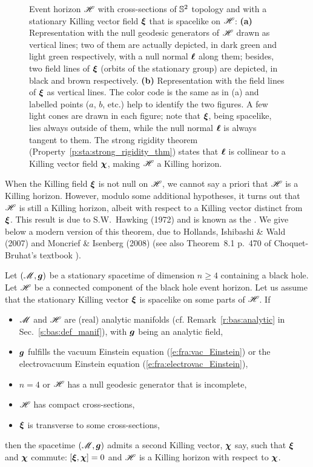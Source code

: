 \begin{figure}
\caption[]{\label{f:sta:rot_horizon} \footnotesize
Event horizon $\mathscr{H}$ with cross-sections of $\mathbb{S}^2$ topology
and with a stationary Killing vector field $\bm{\xi}$ that is
spacelike on $\mathscr{H}$:
\textbf{(a)} Representation with the null geodesic generators of $\mathscr{H}$ drawn as vertical
lines; two of them are actually depicted, in dark green and light green
respectively, with a null normal $\bm{\ell}$ along them; besides,
two field lines of $\bm{\xi}$
(orbits of the stationary group) are depicted, in black and brown
respectively.
\textbf{(b)} Representation with the field lines of $\bm{\xi}$ as vertical lines.
The color code is the same as in (a) and
labelled points ($a$, $b$, etc.) help to identify
the two figures. A few light cones are drawn in each figure; note that $\bm{\xi}$,
being spacelike,
lies always outside of them,
while the null normal $\bm{\ell}$ is always tangent to them.
The strong rigidity theorem (Property~\ref{p:sta:strong_rigidity_thm}) states that
$\bm{\ell}$ is collinear to a Killing vector field $\bm{\chi}$, making $\mathscr{H}$
a Killing horizon.}
\end{figure}

When the Killing field $\bm{\xi}$ is not null on $\mathscr{H}$, we cannot say a priori
that $\mathscr{H}$ is a Killing horizon. However, modulo some additional hypotheses,
it turns out that $\mathscr{H}$ is still a Killing horizon, albeit with
respect to a Killing vector distinct from $\bm{\xi}$. This result is due to
S.W.~Hawking (1972)
\cite{Hawki72,HawkiE73} and is known as the
.
We give below a modern version of this theorem, due to
Hollands, Ishibashi \& Wald (2007) \cite{HollaIW07}
and Moncrief \& Isenberg (2008) \cite{MoncrI08} (see also
Theorem~8.1 p.~470 of Choquet-Bruhat's textbook \cite{Choqu09}).

\begin{prop}
\label{p:sta:strong_rigidity_thm}
Let $(\mathscr{M},\bm{g})$ be a stationary spacetime of dimension $n\geq 4$ containing a black
hole. Let $\mathscr{H}$ be a connected component of the black hole event horizon.
Let us assume that the stationary Killing vector $\bm{\xi}$
is spacelike on some parts of $\mathscr{H}$. If
\begin{itemize}
\item $\mathscr{M}$ and $\mathscr{H}$ are (real) analytic manifolds
(cf. Remark~\ref{r:bas:analytic} in Sec.~\ref{s:bas:def_manif}),
with $\bm{g}$ being an analytic field,
\item $\bm{g}$ fulfills the vacuum Einstein equation (\ref{e:fra:vac_Einstein})
or the electrovacuum Einstein equation (\ref{e:fra:electrovac_Einstein}),
\item $n=4$ or $\mathscr{H}$ has a null geodesic generator that is incomplete,
\item $\mathscr{H}$ has compact cross-sections,
\item $\bm{\xi}$ is transverse to some cross-sections,
\end{itemize}
then the spacetime $(\mathscr{M},\bm{g})$ admits a second Killing vector, $\bm{\chi}$
say, such that $\bm{\xi}$ and $\bm{\chi}$ commute: $[\bm{\xi}, \bm{\chi}] = 0$ and
$\mathscr{H}$ is a Killing horizon with respect to $\bm{\chi}$.
\end{prop}

